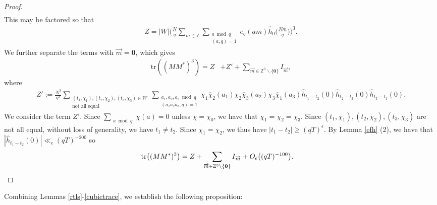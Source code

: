 \documentclass[12pt]{amsart}
\theoremstyle{definition}
\theoremstyle{plain}
\theoremstyle{remark}
\numberwithin{equation}{section}
\numberwithin{theorem}{section}
\numberwithin{equation}{section}
\begin{document}
\begin{proof}
\begin{align*}
		\end{align*}
		This may be factored so that
		\begin{align*}
			Z=|W|\bigg(\frac{N}{q}\sum_{m \in \mathbb {Z}}\sum_{\substack{a \bmod q \\ (a,q)=1}}e_q(am)\hat{h}_{0}\bigg(\frac{Nm}{q}\bigg)\bigg)^{3}.
		\end{align*}
		We further separate the terms with $\overrightarrow{m}=\mathbf{0}$, which gives
		\begin{align*}
			\mbox{tr}((MM^{*})^{3})
			= Z &+ Z' +\sum_{\overrightarrow{m}\in \mathbb{Z}^{3} \backslash \{\mathbf{0}\}}I_{\overrightarrow{m}},
		\end{align*}
		where
		\begin{align*}
			Z':= \frac{N^{3}}{q^{3}}\sum_{\substack{(t_1,\chi_1),(t_2,\chi_2),(t_3,\chi_3) \in W \\ \text{not all equal}}}\sum_{\substack{a_1,a_2,a_3 \bmod q \\ (a_1a_2a_3,q)=1}}\chi_{1}\overline{\chi}_{2}(a_{1})
			\chi_{2}\overline{\chi}_{3}(a_{2})
			\chi_{3}\overline{\chi}_{1}(a_{3})\hat{h}_{t_{1}-t_{2}}(0)\hat{h}_{t_{2}-t_{3}}(0)\hat{h}_{t_{3}-t_{1}}(0).
		\end{align*}
		We consider the term $Z'$. Since $\sum_{\substack{a \bmod q}}\chi(a)=0$ unless $\chi=\chi_0$, we have that $\chi_1=\chi_2=\chi_3$. Since $(t_1,\chi_1), (t_2,\chi_2),(t_3,\chi_3)$ are not all equal, without loss of generality, we have $t_1 \neq t_2$. Since $\chi_1=\chi_2$, we thus have $|t_1 -t_2| \geq (qT)^{\epsilon}$. By Lemma \ref{efh} (2), we have that $|\hat{h}_{t_1-t_2}(0)| \ll_{\epsilon} (qT)^{-200}$ so
		\begin{align*}
			\operatorname{tr}\bigl((MM^{*})^{3}\bigr)
			&= Z
			+ \sum_{\overrightarrow{m}\in
				\mathbb{Z}^{3}\setminus\{\mathbf{0}\}}
			I_{\overrightarrow{m}}
			+ O_{\epsilon}\bigl((qT)^{-100}\bigr).
			\qedhere
		\end{align*}
	\end{proof}
	\noindent
	Combining Lemmas \ref{rtls}-\ref{cubictrace}, we establish the following proposition: 
	
\end{document}
